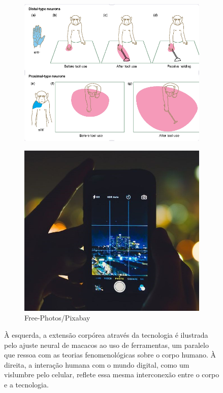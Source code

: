 \begin{figure}[ht]
	\centering
	\begin{subfigure}{0.45\textwidth}
		\includegraphics[width=\linewidth]{images/tools_for_the_body.png}
        \caption*{}
	\end{subfigure}
	\hfill
	\begin{subfigure}{0.45\textwidth}
		\includegraphics[width=\linewidth]{images/tools_for_the_mind.jpg}
		\caption*{Free-Photos/Pixabay}
	\end{subfigure}
	\caption{À esquerda, a extensão corpórea através da tecnologia é ilustrada pelo ajuste neural de macacos ao uso de ferramentas, um paralelo que ressoa com as teorias fenomenológicas sobre o corpo humano. À direita, a interação humana com o mundo digital, como um vislumbre pelo celular, reflete essa mesma interconexão entre o corpo e a tecnologia.}
\end{figure}

